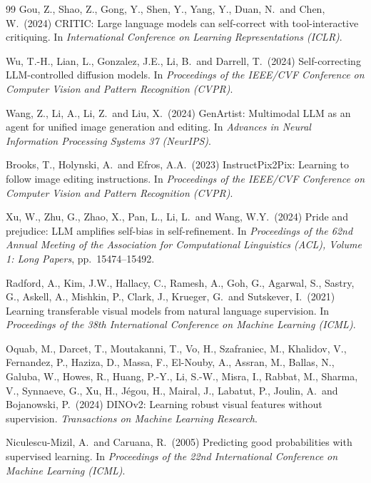 \documentclass{article}
\begin{document}
\begin{thebibliography}{99}
Gou, Z., Shao, Z., Gong, Y., Shen, Y., Yang, Y., Duan, N.\ and Chen, W.\ (2024)
CRITIC: Large language models can self-correct with tool-interactive critiquing.
In {\it International Conference on Learning Representations (ICLR)}.

Wu, T.-H., Lian, L., Gonzalez, J.E., Li, B.\ and Darrell, T.\ (2024)
Self-correcting LLM-controlled diffusion models.
In {\it Proceedings of the IEEE/CVF Conference on Computer Vision and Pattern Recognition (CVPR)}.

Wang, Z., Li, A., Li, Z.\ and Liu, X.\ (2024)
GenArtist: Multimodal LLM as an agent for unified image generation and editing.
In {\it Advances in Neural Information Processing Systems 37 (NeurIPS)}.

Brooks, T., Holynski, A.\ and Efros, A.A.\ (2023)
InstructPix2Pix: Learning to follow image editing instructions.
In {\it Proceedings of the IEEE/CVF Conference on Computer Vision and Pattern Recognition (CVPR)}.

Xu, W., Zhu, G., Zhao, X., Pan, L., Li, L.\ and Wang, W.Y.\ (2024)
Pride and prejudice: LLM amplifies self-bias in self-refinement.
In {\it Proceedings of the 62nd Annual Meeting of the Association for Computational Linguistics
(ACL), Volume 1: Long Papers}, pp.\ 15474--15492.

Radford, A., Kim, J.W., Hallacy, C., Ramesh, A., Goh, G., Agarwal, S., Sastry, G., Askell, A.,
Mishkin, P., Clark, J., Krueger, G.\ and Sutskever, I.\ (2021)
Learning transferable visual models from natural language supervision.
In {\it Proceedings of the 38th International Conference on Machine Learning (ICML)}.

Oquab, M., Darcet, T., Moutakanni, T., Vo, H., Szafraniec, M., Khalidov, V., Fernandez, P.,
Haziza, D., Massa, F., El-Nouby, A., Assran, M., Ballas, N., Galuba, W., Howes, R., Huang, P.-Y.,
Li, S.-W., Misra, I., Rabbat, M., Sharma, V., Synnaeve, G., Xu, H., J\'egou, H., Mairal, J.,
Labatut, P., Joulin, A.\ and Bojanowski, P.\ (2024)
DINOv2: Learning robust visual features without supervision.
{\it Transactions on Machine Learning Research}.

Niculescu-Mizil, A.\ and Caruana, R.\ (2005)
Predicting good probabilities with supervised learning.
In {\it Proceedings of the 22nd International Conference on Machine Learning (ICML)}.


\end{thebibliography}
\end{document}
